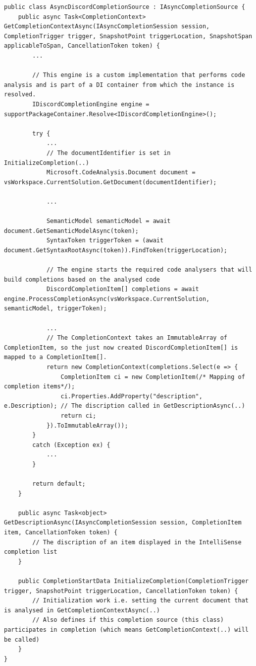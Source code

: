 \begin{lstlisting}[style=CSharp, caption={Discord Completion Source}, label={lst:discordCompletionSource}]
public class AsyncDiscordCompletionSource : IAsyncCompletionSource {
	public async Task<CompletionContext> GetCompletionContextAsync(IAsyncCompletionSession session, CompletionTrigger trigger, SnapshotPoint triggerLocation, SnapshotSpan applicableToSpan, CancellationToken token) {
		...
		
		// This engine is a custom implementation that performs code analysis and is part of a DI container from which the instance is resolved.
		IDiscordCompletionEngine engine = supportPackageContainer.Resolve<IDiscordCompletionEngine>();
		
		try {
			...
			// The documentIdentifier is set in InitializeCompletion(..)
			Microsoft.CodeAnalysis.Document document = vsWorkspace.CurrentSolution.GetDocument(documentIdentifier);
			
			...
			
			SemanticModel semanticModel = await document.GetSemanticModelAsync(token);
			SyntaxToken triggerToken = (await document.GetSyntaxRootAsync(token)).FindToken(triggerLocation);
			
			// The engine starts the required code analysers that will build completions based on the analysed code
			DiscordCompletionItem[] completions = await engine.ProcessCompletionAsync(vsWorkspace.CurrentSolution, semanticModel, triggerToken);
			
			...	
			// The CompletionContext takes an ImmutableArray of CompletionItem, so the just now created DiscordCompletionItem[] is mapped to a CompletionItem[].
			return new CompletionContext(completions.Select(e => {
				CompletionItem ci = new CompletionItem(/* Mapping of completion items*/);
				ci.Properties.AddProperty("description", e.Description); // The discription called in GetDescriptionAsync(..)
				return ci;
			}).ToImmutableArray());
		}
		catch (Exception ex) {
			...
		}
		
		return default;
	}
	
	public async Task<object> GetDescriptionAsync(IAsyncCompletionSession session, CompletionItem item, CancellationToken token) {
		// The discription of an item displayed in the IntelliSense completion list
	}
	
	public CompletionStartData InitializeCompletion(CompletionTrigger trigger, SnapshotPoint triggerLocation, CancellationToken token) {
		// Initialization work i.e. setting the current document that is analysed in GetCompletionContextAsync(..)
		// Also defines if this completion source (this class) participates in completion (which means GetCompletionContext(..) will be called)
	}
}
\end{lstlisting}
